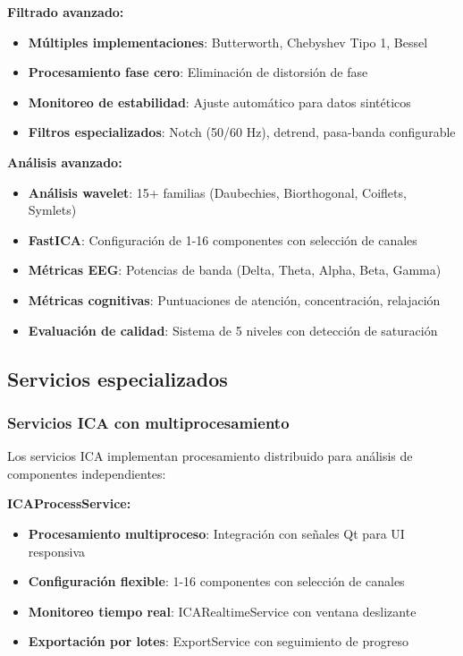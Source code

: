 \textbf{Filtrado avanzado:}
\begin{itemize}
    \item \textbf{Múltiples implementaciones}: Butterworth, Chebyshev Tipo 1, Bessel
    \item \textbf{Procesamiento fase cero}: Eliminación de distorsión de fase
    \item \textbf{Monitoreo de estabilidad}: Ajuste automático para datos sintéticos
    \item \textbf{Filtros especializados}: Notch (50/60 Hz), detrend, pasa-banda configurable
\end{itemize}

\textbf{Análisis avanzado:}
\begin{itemize}
    \item \textbf{Análisis wavelet}: 15+ familias (Daubechies, Biorthogonal, Coiflets, Symlets)
    \item \textbf{FastICA}: Configuración de 1-16 componentes con selección de canales
    \item \textbf{Métricas EEG}: Potencias de banda (Delta, Theta, Alpha, Beta, Gamma)
    \item \textbf{Métricas cognitivas}: Puntuaciones de atención, concentración, relajación
    \item \textbf{Evaluación de calidad}: Sistema de 5 niveles con detección de saturación
\end{itemize}

\subsection{Servicios especializados}
\label{subsec:servicios_especializados_eeg}

\subsubsection{Servicios ICA con multiprocesamiento}

Los servicios ICA implementan procesamiento distribuido para análisis de componentes independientes:

\textbf{ICAProcessService:}
\begin{itemize}
    \item \textbf{Procesamiento multiproceso}: Integración con señales Qt para UI responsiva
    \item \textbf{Configuración flexible}: 1-16 componentes con selección de canales
    \item \textbf{Monitoreo tiempo real}: ICARealtimeService con ventana deslizante
    \item \textbf{Exportación por lotes}: ExportService con seguimiento de progreso
\end{itemize}

